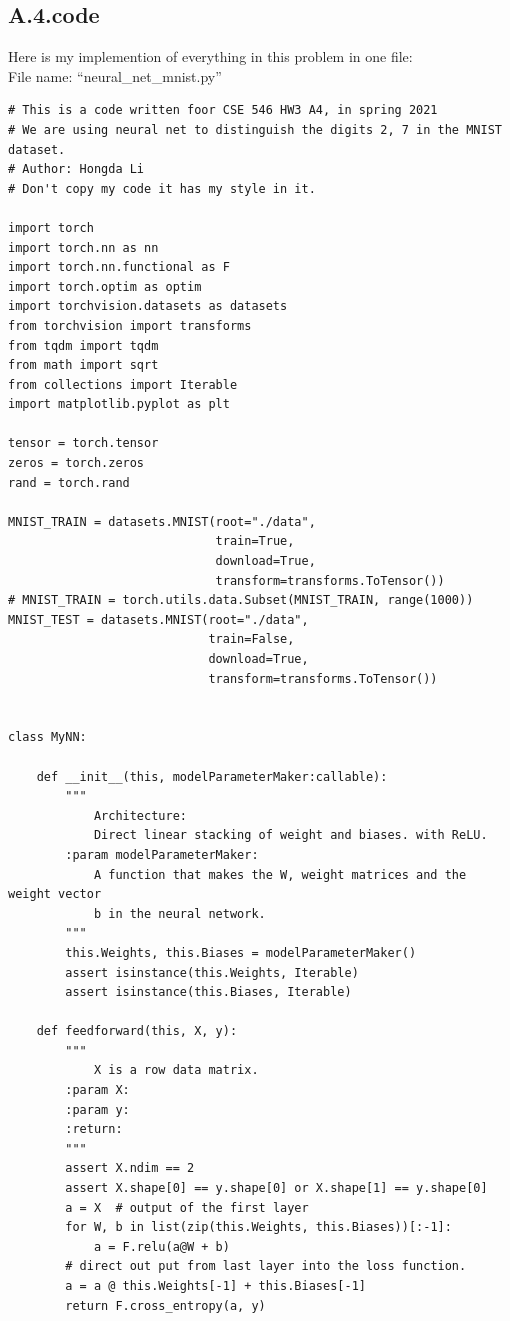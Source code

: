 \documentclass[]{article}
\begin{document}
    \subsection*{A.4.code}\label{A.4.code}
    Here is my implemention of everything in this problem in one file: 
    \\
    File name: ``neural\_net\_mnist.py''
    \begin{lstlisting}
# This is a code written foor CSE 546 HW3 A4, in spring 2021
# We are using neural net to distinguish the digits 2, 7 in the MNIST dataset.
# Author: Hongda Li
# Don't copy my code it has my style in it.

import torch
import torch.nn as nn
import torch.nn.functional as F
import torch.optim as optim
import torchvision.datasets as datasets
from torchvision import transforms
from tqdm import tqdm
from math import sqrt
from collections import Iterable
import matplotlib.pyplot as plt

tensor = torch.tensor
zeros = torch.zeros
rand = torch.rand

MNIST_TRAIN = datasets.MNIST(root="./data",
                             train=True,
                             download=True,
                             transform=transforms.ToTensor())
# MNIST_TRAIN = torch.utils.data.Subset(MNIST_TRAIN, range(1000))
MNIST_TEST = datasets.MNIST(root="./data",
                            train=False,
                            download=True,
                            transform=transforms.ToTensor())


class MyNN:

    def __init__(this, modelParameterMaker:callable):
        """
            Architecture:
            Direct linear stacking of weight and biases. with ReLU.
        :param modelParameterMaker:
            A function that makes the W, weight matrices and the weight vector
            b in the neural network.
        """
        this.Weights, this.Biases = modelParameterMaker()
        assert isinstance(this.Weights, Iterable)
        assert isinstance(this.Biases, Iterable)

    def feedforward(this, X, y):
        """
            X is a row data matrix.
        :param X:
        :param y:
        :return:
        """
        assert X.ndim == 2
        assert X.shape[0] == y.shape[0] or X.shape[1] == y.shape[0]
        a = X  # output of the first layer
        for W, b in list(zip(this.Weights, this.Biases))[:-1]:
            a = F.relu(a@W + b)
        # direct out put from last layer into the loss function.
        a = a @ this.Weights[-1] + this.Biases[-1]
        return F.cross_entropy(a, y)


\end{lstlisting}
\end{document}
